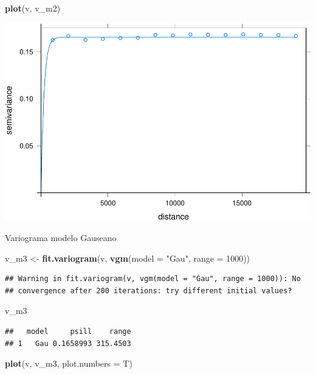 \documentclass[11pt,]{article}
\newenvironment{Shaded}{\begin{snugshade}}{\end{snugshade}}
\newcommand{\KeywordTok}[1]{\textcolor[rgb]{0.13,0.29,0.53}{\textbf{#1}}}
\newcommand{\DataTypeTok}[1]{\textcolor[rgb]{0.13,0.29,0.53}{#1}}
\newcommand{\DecValTok}[1]{\textcolor[rgb]{0.00,0.00,0.81}{#1}}
\newcommand{\StringTok}[1]{\textcolor[rgb]{0.31,0.60,0.02}{#1}}
\newcommand{\NormalTok}[1]{#1}
\begin{document}
\begin{Shaded}
\begin{Highlighting}[]
\KeywordTok{plot}\NormalTok{(v, v_m2)}
\end{Highlighting}
\end{Shaded}

\includegraphics{proyecto_f_files/figure-latex/unnamed-chunk-94-1.pdf}

Variograma modelo Gauseano

\begin{Shaded}
\begin{Highlighting}[]
\NormalTok{v_m3 <-}\StringTok{ }\KeywordTok{fit.variogram}\NormalTok{(v, }\KeywordTok{vgm}\NormalTok{(}\DataTypeTok{model =} \StringTok{"Gau"}\NormalTok{, }\DataTypeTok{range =} \DecValTok{1000}\NormalTok{))}
\end{Highlighting}
\end{Shaded}

\begin{verbatim}
## Warning in fit.variogram(v, vgm(model = "Gau", range = 1000)): No
## convergence after 200 iterations: try different initial values?
\end{verbatim}

\begin{Shaded}
\begin{Highlighting}[]
\NormalTok{v_m3}
\end{Highlighting}
\end{Shaded}

\begin{verbatim}
##   model     psill    range
## 1   Gau 0.1658993 315.4503
\end{verbatim}

\begin{Shaded}
\begin{Highlighting}[]
\KeywordTok{plot}\NormalTok{(v, v_m3, }\DataTypeTok{plot.numbers =}\NormalTok{ T)}
\end{Highlighting}
\end{Shaded}
\end{document}
